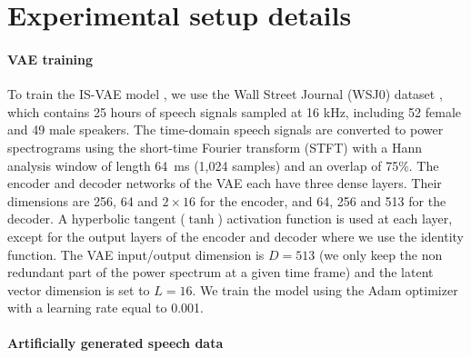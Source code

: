 \documentclass[review]{elsarticle}
\begin{document}
\section{Experimental setup details}
\label{app:setup}

\paragraph{VAE training} 

To train the IS-VAE model \citep{bando2018statistical,leglaive_MLSP18, girin2019}, we use the Wall Street Journal (WSJ0) dataset \citep{WSJ0}, which contains 25 hours of speech signals sampled at 16 kHz, including 52 female and 49 male speakers. The time-domain speech signals are converted to power spectrograms using the short-time Fourier transform (STFT) with a Hann analysis window of length 64~ms (1,024 samples) and an overlap of 75\%. The encoder and decoder networks of the VAE each have three dense layers. Their dimensions are 256, 64 and $2 \times 16$ for the encoder, and 64, 256 and 513 for the decoder. A hyperbolic tangent ($\tanh$) activation function is used at each layer, except for the output layers of the encoder and decoder where we use the identity function. The VAE input/output dimension is $D=513$ (we only keep the non redundant part of the power spectrum at a given time frame) and the latent vector dimension is set to $L= 16$. We train the model using the Adam optimizer \citep{DBLP:journals/corr/KingmaB14} with a learning rate equal to 0.001.

\paragraph{Artificially generated speech data} 
\end{document}
